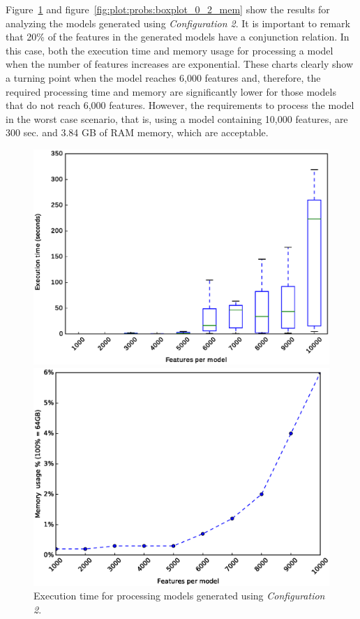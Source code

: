 Figure~\ref{fig:plot:probs:boxplot_0_2} and figure~\ref{fig:plot:probs:boxplot_0_2_mem} show the results for analyzing the models generated using \textit{Configuration 2}. It is important to remark that 20\% of the features in the generated models have a conjunction relation. In this case, both the execution time and memory usage for processing a model when the number of features increases are exponential. These charts clearly show a turning point when the model reaches 6,000 features and, therefore, the required processing time and  memory are significantly lower for those models that do not reach 6,000 features. However, the requirements to process the model in the worst case scenario, that is, using a model containing 10,000 features, are 300 sec. and 3.84 GB of RAM memory, which are acceptable.

\begin{figure}[h]
        \centering
        \begin{minipage}[b]{0.48\textwidth}
                \includegraphics[width=\textwidth]{boxplot_0_2.eps}
                \caption{Execution time for processing models generated using \textit{Configuration 2}.}\label{fig:plot:probs:boxplot_0_2}
        \end{minipage}
        \hfill
        \begin{minipage}[b]{0.48\textwidth}
                \includegraphics[width=\textwidth]{boxplot_mem.eps}

\end{minipage}
\end{figure}

